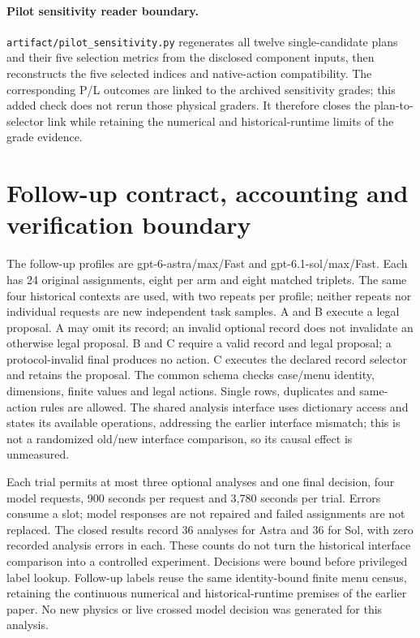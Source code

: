 \paragraph{Pilot sensitivity reader boundary.}
\texttt{artifact/pilot\_sensitivity.py} regenerates all twelve single-candidate
plans and their five selection metrics from the disclosed component inputs,
then reconstructs the five selected indices and native-action compatibility.
The corresponding P/L outcomes are linked to the archived sensitivity grades;
this added check does not rerun those physical graders. It therefore closes
the plan-to-selector link while retaining the numerical and historical-runtime
limits of the grade evidence.


\section{Follow-up contract, accounting and verification boundary}
\label{app:followup}
The follow-up profiles are gpt-6-astra/max/Fast and gpt-6.1-sol/max/Fast.
Each has 24 original assignments, eight per arm and eight matched triplets.
The same four historical contexts are used, with two repeats per profile;
neither repeats nor individual requests are new independent task samples.
A and B execute a legal proposal. A may omit its record; an invalid optional
record does not invalidate an otherwise legal proposal. B and C require a
valid record and legal proposal; a protocol-invalid final produces no action.
C executes the declared record selector and retains the proposal. The common
schema checks case/menu identity, dimensions, finite values and legal actions.
Single rows, duplicates and same-action rules are allowed. The shared
analysis interface uses dictionary access and states its available operations,
addressing the earlier interface mismatch; this is not a randomized old/new
interface comparison, so its causal effect is unmeasured.

Each trial permits at most three optional analyses and one final decision,
four model requests, 900 seconds per request and 3,780 seconds per trial.
Errors consume a slot; model responses are not repaired and failed
assignments are not replaced. The closed results record 36 analyses for
Astra and 36 for Sol, with zero recorded analysis errors in each. These counts
do not turn the historical interface comparison into a controlled experiment.
Decisions were bound before privileged label lookup. Follow-up labels reuse
the same identity-bound finite menu census, retaining the continuous numerical
and historical-runtime premises of the earlier paper. No new physics or
live crossed model decision was generated for this analysis.

